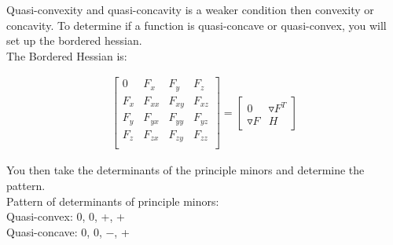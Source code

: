 \documentclass{article}
\begin{document}
Quasi-convexity and quasi-concavity is a weaker condition then convexity or concavity. To determine if a function is quasi-concave or quasi-convex, you will set up the bordered hessian. \\

The Bordered Hessian is: 

\begin{align}
    \begin{bmatrix}
        0 & F_{x} & F_{y} & F_{z}\\
        F_{x} & F_{xx} &  F_{xy} & F_{xz}\\
        F_{y} & F_{yx} & F_{yy} &F_{yz}\\
        F_{z} & F_{zx} & F_{zy} &F_{zz}\\
    \end{bmatrix} = 
    \begin{bmatrix}
        0 & \triangledown F^T\\
        \triangledown F & H
    \end{bmatrix}
\end{align}

You then take the determinants of the principle minors and determine the pattern. \\

Pattern of determinants of principle minors:\\
Quasi-convex: 0, 0, +, + \\
Quasi-concave: 0, 0, $-$, +
\end{document}
